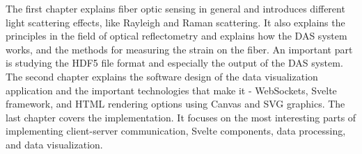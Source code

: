 The first chapter explains fiber optic sensing in general and introduces different light scattering effects, like Rayleigh and Raman scattering. It also explains the principles in the field of optical reflectometry and explains how the DAS system works, and the methods for measuring the strain on the fiber. An important part is studying the HDF5 file format and especially the output of the DAS system. The second chapter explains the software design of the data visualization application and the important technologies that make it - WebSockets, Svelte framework, and HTML rendering options using Canvas and SVG graphics. The last chapter covers the implementation. It focuses on the most interesting parts of implementing client-server communication, Svelte components, data processing, and data visualization.















